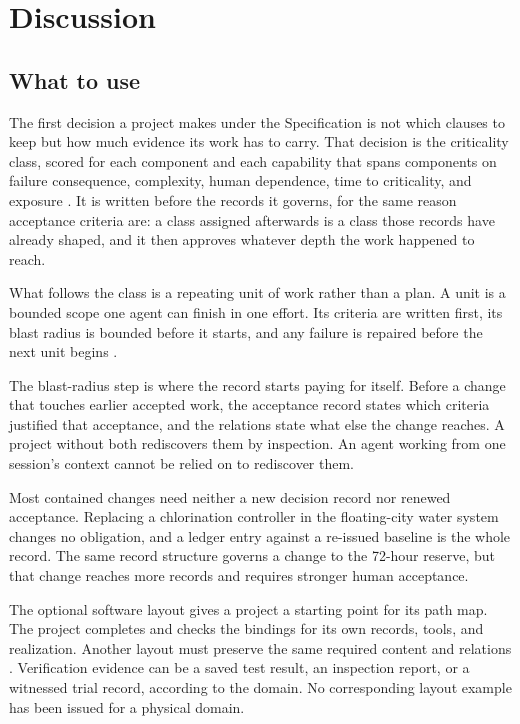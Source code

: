 \section{Discussion}\label{sec:discussion}

\subsection{What to use}

The first decision a project makes under the Specification is not which clauses to keep but how much evidence its work has to carry. That decision is the criticality class, scored for each component and each capability that spans components on failure consequence, complexity, human dependence, time to criticality, and exposure \citep[Section~\hyperlink{nss-7.10}{7.10}]{pss2026}. It is written before the records it governs, for the same reason acceptance criteria are: a class assigned afterwards is a class those records have already shaped, and it then approves whatever depth the work happened to reach.

What follows the class is a repeating unit of work rather than a plan. A unit is a bounded scope one agent can finish in one effort. Its criteria are written first, its blast radius is bounded before it starts, and any failure is repaired before the next unit begins \citep[Sections~\hyperlink{nss-5.5}{5.5}, \hyperlink{nss-5.6}{5.6}, and~\hyperlink{nss-5.9}{5.9}]{pss2026}.

The blast-radius step is where the record starts paying for itself. Before a change that touches earlier accepted work, the acceptance record states which criteria justified that acceptance, and the relations state what else the change reaches. A project without both rediscovers them by inspection. An agent working from one session's context cannot be relied on to rediscover them.

Most contained changes need neither a new decision record nor renewed acceptance. Replacing a chlorination controller in the floating-city water system changes no obligation, and a ledger entry against a re-issued baseline is the whole record. The same record structure governs a change to the 72-hour reserve, but that change reaches more records and requires stronger human acceptance.

The optional software layout gives a project a starting point for its path map. The project completes and checks the bindings for its own records, tools, and realization. Another layout must preserve the same required content and relations \citep[Sections~\hyperlink{nss-1.8}{1.8} and~\hyperlink{nss-14.8}{14.8}]{pss2026}. Verification evidence can be a saved test result, an inspection report, or a witnessed trial record, according to the domain. No corresponding layout example has been issued for a physical domain.

